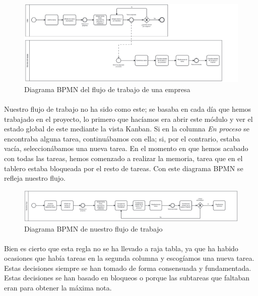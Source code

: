 \begin{figure}[h]
    \centering
    \includegraphics[width=1\linewidth]{ProjectsBPMN.png}
    \caption{Diagrama BPMN del flujo de trabajo de una empresa}
    \label{fig:BMMN_trabajo}
\end{figure}
\paragraph{}
Nuestro flujo de trabajo no ha sido como este; se basaba en cada día que hemos trabajado en el proyecto, lo primero que hacíamos era abrir este módulo y ver el estado global de este mediante la vista Kanban. Si en la columna \textit{En proceso} se encontraba alguna tarea, continuábamos con ella; si, por el contrario, estaba vacía, seleccionábamos una nueva tarea. En el momento en que hemos acabado con todas las tareas, hemos comenzado a realizar la memoria, tarea que en el tablero estaba bloqueada por el resto de tareas. Con este diagrama BPMN se refleja nuestro flujo.

\begin{figure}[h]
    \centering
    \includegraphics[width=1\linewidth]{ProjectsBPMN_2.png}
    \caption{Diagrama BPMN de nuestro flujo de trabajo}
\end{figure}
\paragraph{}
Bien es cierto que esta regla no se ha llevado a raja tabla, ya que ha habido ocasiones que había tareas en la segunda columna y escogíamos una nueva tarea. Estas decisiones siempre se han tomado de forma consensuada y fundamentada. Estas decisiones se han basado en bloqueos o porque las subtareas que faltaban eran para obtener la máxima nota.

